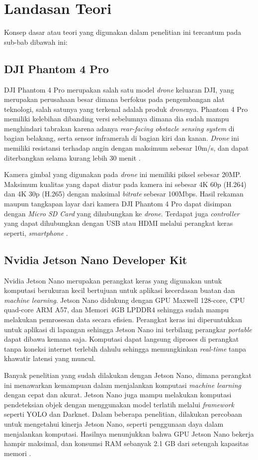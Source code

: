 \section{Landasan Teori}
Konsep dasar atau teori yang digunakan dalam penelitian ini tercantum pada sub-bab dibawah ini:

\subsection{DJI Phantom 4 Pro}
DJI Phantom 4 Pro merupakan salah satu model \emph{drone} keluaran DJI, yang merupakan perusahaan besar dimana berfokus pada pengembangan alat teknologi, salah satunya yang terkenal adalah produk \emph{drone}nya. Phantom 4 Pro memiliki kelebihan dibanding versi sebelumnya dimana dia sudah mampu menghindari tabrakan karena adanya \emph{rear-facing obstacle sensing system} di bagian belakang, serta sensor inframerah di bagian kiri dan kanan. \emph{Drone} ini memiliki resistansi terhadap angin dengan maksimum sebesar 10m/s, dan dapat diterbangkan selama kurang lebih 30 menit \cite{djiphantom4pro}.

Kamera gimbal yang digunakan pada \emph{drone} ini memiliki piksel sebesar 20MP. Maksimum kualitas yang dapat diatur pada kamera ini sebesar 4K 60p (H.264) dan 4K 30p (H.265) dengan maksimal \emph{bitrate} sebesar 100Mbps. Hasil rekaman maupun tangkapan layar dari kamera DJI Phantom 4 Pro dapat disimpan dengan \emph{Micro SD Card} yang dihubungkan ke \emph{drone}. Terdapat juga \emph{controller} yang dapat dihubungkan dengan USB atau HDMI melalui perangkat keras seperti, \emph{smartphone} \cite{djiphantom4pro}. 

\subsection{Nvidia Jetson Nano Developer Kit}
Nvidia Jetson Nano merupakan perangkat keras yang digunakan untuk komputasi berukuran kecil bertujuan untuk aplikasi kecerdasan buatan dan \emph{machine learning}. Jetson Nano didukung dengan GPU Maxwell 128-core, CPU quad-core ARM A57, dan Memori 4GB LPDDR4 sehingga sudah mampu melakukan pemrosesan data secara efisien. Perangkat keras ini diperuntukkan untuk aplikasi di lapangan sehingga Jetson Nano ini terbilang perangkar \emph{portable} dapat dibawa kemana saja. Komputasi dapat langsung diproses di perangkat tanpa koneksi internet terlebih dahulu sehingga memungkinkan \emph{real-time} tanpa khawatir latensi yang muncul.

Banyak penelitian yang sudah dilakukan dengan Jetson Nano, dimana perangkat ini menawarkan kemampuan dalam menjalankan komputasi \emph{machine learning} dengan cepat dan akurat. Jetson Nano juga mampu melakukan komputasi pendeteksian objek dengan menggunakan model terlatih melalui \emph{framework} seperti YOLO dan Darknet. Dalam beberapa penelitian, dilakukan percobaan untuk mengetahui kinerja Jetson Nano, seperti penggunaan daya dalam menjalankan komputasi. Hasilnya menunjukkan bahwa GPU Jetson Nano bekerja hampir maksimal, dan konsumsi RAM sebanyak 2.1 GB dari setengah kapasitas memori \cite{jetson-nano}.

